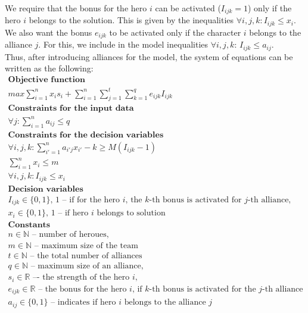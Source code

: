 \documentclass[smallextended]{svjour3}       %
\begin{document}
We require that the bonus for the hero $i$ can be activated ($ I_{ijk} = 1 $) only if the hero $i$ belongs to the solution. This is given by the inequalities $ \forall {i, j, k}: I_{ijk} \le x_i $. We also want the bonus $ e_{ijk} $ to be activated only if the character $ i $ belongs to the alliance $j$. For this, we include in the model inequalities $ \forall{i, j, k} :\, I_{ijk} \le a_{ij} $.\\
Thus, after introducing alliances for the model, the system of equations can be written as the following:
\begin{equation}
\label{eq:DUIP}
\begin{gathered}
\textbf{Objective function}\\
max \sum_{i=1}^{n} x_i s_i + \sum_{i=1}^{n} \sum_{j=1}^{t}  \sum_{k=1}^{q} e_{ijk} I_{ijk} \\
\textbf{Constraints for the input data}\\
\forall{j} : \sum_{i=1}^n a_{ij} \le q \\
\textbf{Constraints for the decision variables} \\
\forall{i,j,k} :  \sum_{i'=1}^{n} a_{i'j} x_{i'} - k \ge M( I_{ijk}  - 1) \\
\sum_{i=1}^n x_i \le m   \\ 
\forall{i,j,k} :  I_{ijk}  \le x_i \\
\textbf{Decision variables} \\
I_{ijk} \in \{0, 1\} \text {, 1 – if for the hero } i \text{, the } k\text{-th bonus is activated for }  j \text{-th alliance,} \\
x_i  \in \{0, 1\} \text{, 1 -- if hero } i \text{ belongs to solution} \\
\textbf{Constants} \\
n \in \mathbb{N} \text{ -- number of heroues,} \\
m \in \mathbb{N} \text{ -- maximum size of the team}\\
t \in \mathbb{N} \text{ -- the total number of alliances} \\
q \in \mathbb{N} \text{ -- maximum size of an alliance,} \\
s_i  \in \mathbb{R} \text{ –- the strength of the hero } i, \\
e_{ijk} \in \mathbb{R} \text{ -- the bonus for the hero } i \text{,  if } k
\text{-th bonus is activated for the } j \text{-th alliance} \\
a_{ij} \in \{0, 1\} \text{ -- indicates if hero } i \text{ belongs to the alliance } j \\ 
\end{gathered}
\end{equation}
\end{document}
